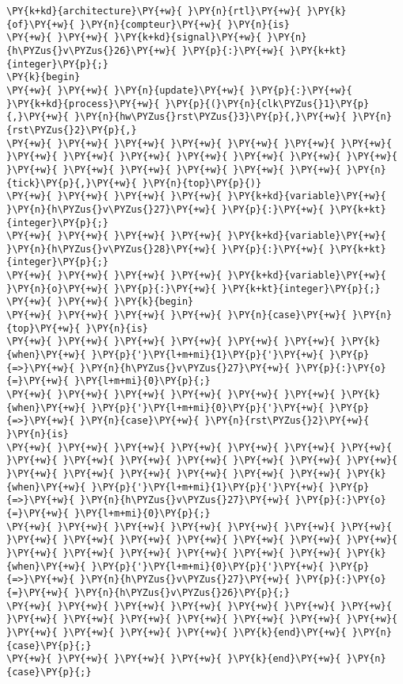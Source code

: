 \begin{Verbatim}[commandchars=\\\{\}]
\PY{k+kd}{architecture}\PY{+w}{ }\PY{n}{rtl}\PY{+w}{ }\PY{k}{of}\PY{+w}{ }\PY{n}{compteur}\PY{+w}{ }\PY{n}{is}
\PY{+w}{ }\PY{+w}{ }\PY{k+kd}{signal}\PY{+w}{ }\PY{n}{h\PYZus{}v\PYZus{}26}\PY{+w}{ }\PY{p}{:}\PY{+w}{ }\PY{k+kt}{integer}\PY{p}{;}
\PY{k}{begin}
\PY{+w}{ }\PY{+w}{ }\PY{n}{update}\PY{+w}{ }\PY{p}{:}\PY{+w}{ }\PY{k+kd}{process}\PY{+w}{ }\PY{p}{(}\PY{n}{clk\PYZus{}1}\PY{p}{,}\PY{+w}{ }\PY{n}{hw\PYZus{}rst\PYZus{}3}\PY{p}{,}\PY{+w}{ }\PY{n}{rst\PYZus{}2}\PY{p}{,}
\PY{+w}{ }\PY{+w}{ }\PY{+w}{ }\PY{+w}{ }\PY{+w}{ }\PY{+w}{ }\PY{+w}{ }\PY{+w}{ }\PY{+w}{ }\PY{+w}{ }\PY{+w}{ }\PY{+w}{ }\PY{+w}{ }\PY{+w}{ }\PY{+w}{ }\PY{+w}{ }\PY{+w}{ }\PY{+w}{ }\PY{+w}{ }\PY{+w}{ }\PY{n}{tick}\PY{p}{,}\PY{+w}{ }\PY{n}{top}\PY{p}{)}
\PY{+w}{ }\PY{+w}{ }\PY{+w}{ }\PY{+w}{ }\PY{k+kd}{variable}\PY{+w}{ }\PY{n}{h\PYZus{}v\PYZus{}27}\PY{+w}{ }\PY{p}{:}\PY{+w}{ }\PY{k+kt}{integer}\PY{p}{;}
\PY{+w}{ }\PY{+w}{ }\PY{+w}{ }\PY{+w}{ }\PY{k+kd}{variable}\PY{+w}{ }\PY{n}{h\PYZus{}v\PYZus{}28}\PY{+w}{ }\PY{p}{:}\PY{+w}{ }\PY{k+kt}{integer}\PY{p}{;}
\PY{+w}{ }\PY{+w}{ }\PY{+w}{ }\PY{+w}{ }\PY{k+kd}{variable}\PY{+w}{ }\PY{n}{o}\PY{+w}{ }\PY{p}{:}\PY{+w}{ }\PY{k+kt}{integer}\PY{p}{;}
\PY{+w}{ }\PY{+w}{ }\PY{k}{begin}
\PY{+w}{ }\PY{+w}{ }\PY{+w}{ }\PY{+w}{ }\PY{n}{case}\PY{+w}{ }\PY{n}{top}\PY{+w}{ }\PY{n}{is}
\PY{+w}{ }\PY{+w}{ }\PY{+w}{ }\PY{+w}{ }\PY{+w}{ }\PY{+w}{ }\PY{k}{when}\PY{+w}{ }\PY{p}{'}\PY{l+m+mi}{1}\PY{p}{'}\PY{+w}{ }\PY{p}{=>}\PY{+w}{ }\PY{n}{h\PYZus{}v\PYZus{}27}\PY{+w}{ }\PY{p}{:}\PY{o}{=}\PY{+w}{ }\PY{l+m+mi}{0}\PY{p}{;}
\PY{+w}{ }\PY{+w}{ }\PY{+w}{ }\PY{+w}{ }\PY{+w}{ }\PY{+w}{ }\PY{k}{when}\PY{+w}{ }\PY{p}{'}\PY{l+m+mi}{0}\PY{p}{'}\PY{+w}{ }\PY{p}{=>}\PY{+w}{ }\PY{n}{case}\PY{+w}{ }\PY{n}{rst\PYZus{}2}\PY{+w}{ }\PY{n}{is}
\PY{+w}{ }\PY{+w}{ }\PY{+w}{ }\PY{+w}{ }\PY{+w}{ }\PY{+w}{ }\PY{+w}{ }\PY{+w}{ }\PY{+w}{ }\PY{+w}{ }\PY{+w}{ }\PY{+w}{ }\PY{+w}{ }\PY{+w}{ }\PY{+w}{ }\PY{+w}{ }\PY{+w}{ }\PY{+w}{ }\PY{+w}{ }\PY{+w}{ }\PY{k}{when}\PY{+w}{ }\PY{p}{'}\PY{l+m+mi}{1}\PY{p}{'}\PY{+w}{ }\PY{p}{=>}\PY{+w}{ }\PY{n}{h\PYZus{}v\PYZus{}27}\PY{+w}{ }\PY{p}{:}\PY{o}{=}\PY{+w}{ }\PY{l+m+mi}{0}\PY{p}{;}
\PY{+w}{ }\PY{+w}{ }\PY{+w}{ }\PY{+w}{ }\PY{+w}{ }\PY{+w}{ }\PY{+w}{ }\PY{+w}{ }\PY{+w}{ }\PY{+w}{ }\PY{+w}{ }\PY{+w}{ }\PY{+w}{ }\PY{+w}{ }\PY{+w}{ }\PY{+w}{ }\PY{+w}{ }\PY{+w}{ }\PY{+w}{ }\PY{+w}{ }\PY{k}{when}\PY{+w}{ }\PY{p}{'}\PY{l+m+mi}{0}\PY{p}{'}\PY{+w}{ }\PY{p}{=>}\PY{+w}{ }\PY{n}{h\PYZus{}v\PYZus{}27}\PY{+w}{ }\PY{p}{:}\PY{o}{=}\PY{+w}{ }\PY{n}{h\PYZus{}v\PYZus{}26}\PY{p}{;}
\PY{+w}{ }\PY{+w}{ }\PY{+w}{ }\PY{+w}{ }\PY{+w}{ }\PY{+w}{ }\PY{+w}{ }\PY{+w}{ }\PY{+w}{ }\PY{+w}{ }\PY{+w}{ }\PY{+w}{ }\PY{+w}{ }\PY{+w}{ }\PY{+w}{ }\PY{+w}{ }\PY{+w}{ }\PY{+w}{ }\PY{k}{end}\PY{+w}{ }\PY{n}{case}\PY{p}{;}
\PY{+w}{ }\PY{+w}{ }\PY{+w}{ }\PY{+w}{ }\PY{k}{end}\PY{+w}{ }\PY{n}{case}\PY{p}{;}
\end{Verbatim}
